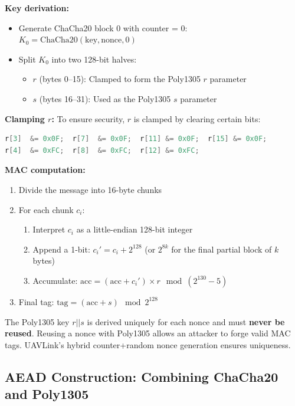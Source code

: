 \documentclass[11pt,a4paper]{article}
\begin{document}
\textbf{Key derivation:}
\begin{itemize}[noitemsep]
    \item Generate ChaCha20 block 0 with counter = 0: $K_0 = \text{ChaCha20}(\text{key}, \text{nonce}, 0)$
    \item Split $K_0$ into two 128-bit halves:
    \begin{itemize}
        \item $r$ (bytes 0--15): Clamped to form the Poly1305 $r$ parameter
        \item $s$ (bytes 16--31): Used as the Poly1305 $s$ parameter
    \end{itemize}
\end{itemize}

\textbf{Clamping $r$:} To ensure security, $r$ is clamped by clearing certain bits:
\begin{lstlisting}[language=C]
r[3]  &= 0x0F;  r[7]  &= 0x0F;  r[11] &= 0x0F;  r[15] &= 0x0F;
r[4]  &= 0xFC;  r[8]  &= 0xFC;  r[12] &= 0xFC;
\end{lstlisting}

\textbf{MAC computation:}
\begin{enumerate}[noitemsep]
    \item Divide the message into 16-byte chunks
    \item For each chunk $c_i$:
    \begin{enumerate}
        \item Interpret $c_i$ as a little-endian 128-bit integer
        \item Append a 1-bit: $c_i' = c_i + 2^{128}$ (or $2^{8k}$ for the final partial block of $k$ bytes)
        \item Accumulate: $\text{acc} = (\text{acc} + c_i') \times r \mod (2^{130} - 5)$
    \end{enumerate}
    \item Final tag: $\text{tag} = (\text{acc} + s) \mod 2^{128}$
\end{enumerate}

\begin{alertbox}
The Poly1305 key $r||s$ is derived uniquely for each nonce and must \textbf{never be reused}. Reusing a nonce with Poly1305 allows an attacker to forge valid MAC tags. UAVLink's hybrid counter+random nonce generation ensures uniqueness.
\end{alertbox}

\subsection{AEAD Construction: Combining ChaCha20 and Poly1305}
\end{document}
